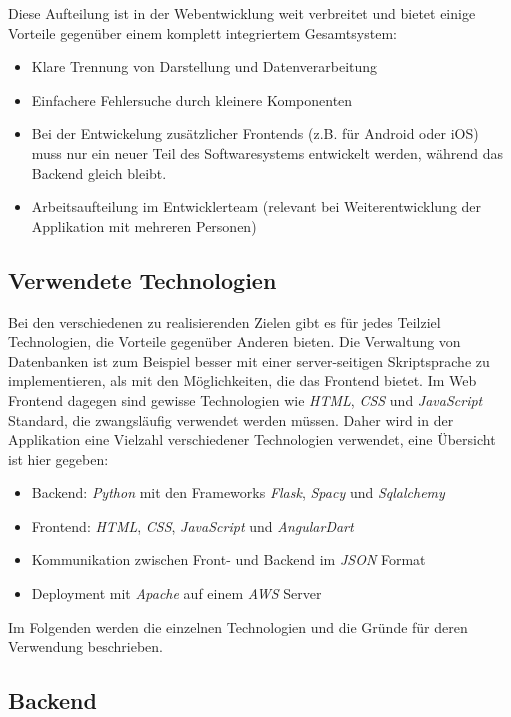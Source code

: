 Diese Aufteilung ist in der Webentwicklung weit verbreitet\cite{Fielding:2000:ASD:932295} und bietet einige Vorteile gegenüber einem komplett integriertem Gesamtsystem:

\begin{itemize}
	\item Klare Trennung von Darstellung und Datenverarbeitung
	\item Einfachere Fehlersuche durch kleinere Komponenten
	\item Bei der Entwickelung zusätzlicher Frontends (z.B. für Android oder iOS) muss nur ein neuer Teil des Softwaresystems entwickelt werden, während das Backend gleich bleibt.
	\item Arbeitsaufteilung im Entwicklerteam (relevant bei Weiterentwicklung der Applikation mit mehreren Personen)
\end{itemize}

\subsection{Verwendete Technologien}
Bei den verschiedenen zu realisierenden Zielen gibt es für jedes Teilziel Technologien, die Vorteile gegenüber Anderen bieten. Die Verwaltung von Datenbanken ist zum Beispiel besser mit einer server-seitigen Skriptsprache zu implementieren, als mit den Möglichkeiten, die das Frontend bietet. Im Web Frontend dagegen sind gewisse Technologien wie \textit{HTML}, \textit{CSS} und \textit{JavaScript} Standard, die zwangsläufig verwendet werden müssen. Daher wird in der Applikation eine Vielzahl verschiedener Technologien verwendet, eine Übersicht ist hier gegeben:

\begin{itemize}
	\item Backend: \textit{Python} mit den Frameworks \textit{Flask}, \textit{Spacy} und \textit{Sqlalchemy}
	\item Frontend: \textit{HTML}, \textit{CSS}, \textit{JavaScript} und \textit{AngularDart}
	\item Kommunikation zwischen Front- und Backend im \textit{JSON} Format
	\item Deployment mit \textit{Apache} auf einem \textit{AWS} Server
\end{itemize}

Im Folgenden werden die einzelnen Technologien und die Gründe für deren Verwendung beschrieben.

\subsection{Backend}
\label{sec:backend}

